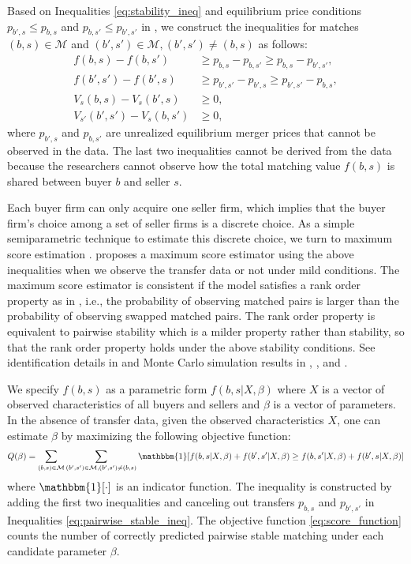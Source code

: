 \documentclass[10pt]{article}
\begin{document}
Based on Inequalities \eqref{eq:stability_ineq} and equilibrium price conditions $p_{b',s}\le p_{b,s}$ and $p_{b,s'}\le p_{b',s'}$ in \cite{akkus2015ms}, we construct the inequalities for matches $(b,s)\in \mathcal{M}$ and $(b',s')\in \mathcal{M}, (b',s')\neq(b,s)$ as follows:
\begin{align}
    f(b,s)-f(b,s')&\ge p_{b,s}-p_{b,s'}\ge p_{b,s}-p_{b',s'},\label{eq:pairwise_stable_ineq}\\
    f(b',s')-f(b',s)&\ge p_{b',s'}-p_{b',s}\ge p_{b',s'}-p_{b,s},\nonumber\\
    V_s(b,s)-V_s(b',s)&\ge 0,\nonumber\\
    V_{s'}(b',s')-V_s(b,s')&\ge 0,\nonumber
\end{align}
where $p_{b',s}$ and $p_{b,s'}$ are unrealized equilibrium merger prices that cannot be observed in the data. The last two inequalities cannot be derived from the data because the researchers cannot observe how the total matching value $f(b,s)$ is shared between buyer $b$ and seller $s$.

Each buyer firm can only acquire one seller firm, which implies that the buyer firm’s
choice among a set of seller firms is a discrete choice. 
As a simple semiparametric technique to estimate this discrete choice, we turn to maximum score estimation \cite{manski1975maximum,manski1985semiparametric}.
\cite{fox2018qe} proposes a maximum score
estimator using the above inequalities when we observe the transfer data or not under mild conditions. 
The maximum score estimator is consistent if the model satisfies a rank order property as in \cite{manski1975maximum,manski1985semiparametric}, i.e., the probability of observing matched pairs is larger than the probability of observing swapped matched pairs. 
The rank order property is equivalent to pairwise stability which is a milder property rather than stability, so that the rank order property holds under the above stability conditions. See identification details in \cite{fox2010qe} and Monte Carlo simulation results in \cite{fox2018qe}, \cite{akkus2015ms}, and \cite{otani2021matching_cost}.

We specify $f(b,s)$ as a parametric form $f(b,s|X,\beta)$ where $X$ is a vector of observed characteristics of all buyers and sellers and $\beta$ is a vector of parameters. 
In the absence of transfer data, given the observed characteristics $X$, one can estimate $\beta$ by maximizing the following objective function:
\begin{align}
    Q(\beta)=\sum_{(b,s)\in \mathcal{M}} \sum_{(b',s')\in \mathcal{M},(b',s')\neq (b,s)} \mathbbm{1}[f(b,s|X,\beta)+ f(b',s'|X,\beta)\ge f(b,s'|X,\beta)+f(b',s|X,\beta)]\label{eq:score_function}
\end{align}
where $\mathbbm{1}[\cdot]$ is an indicator function. 
The inequality is constructed by adding the first two inequalities and canceling out transfers $p_{b,s}$ and $p_{b',s'}$ in Inequalities \eqref{eq:pairwise_stable_ineq}.
The objective function \eqref{eq:score_function} counts the number of correctly predicted pairwise stable matching under each candidate parameter $\beta$.
\end{document}
